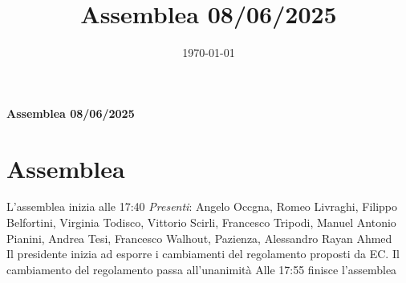 \documentclass[12pt, twoside, italian]{book}
\title{Assemblea 08/06/2025}
\author{}
\date{\today}
\begin{document}
	\begin{titlepage}
	\centering
	\vspace*{3cm}
	{\huge\bfseries Assemblea 08/06/2025 \par}
	\vspace{2cm}
	{\Large\itshape \par}
	\vfill




	\vfill
	\end{titlepage}
	\pagestyle{empty}
	\cleardoublepage
	\vspace*{8cm}
	\cleardoublepage
	\pagestyle{fancy}
	\tableofcontents
	\chapter{Assemblea}
	L'assemblea inizia alle 17:40
	\emph{Presenti}: Angelo Occgna, Romeo Livraghi, Filippo Belfortini, Virginia Todisco, Vittorio Scirli, Francesco Tripodi, Manuel Antonio Pianini, Andrea Tesi, Francesco Walhout, Pazienza, Alessandro Rayan Ahmed \\
    Il presidente inizia ad esporre i cambiamenti del regolamento proposti da EC. Il cambiamento del regolamento passa all'unanimità
    Alle 17:55 finisce l'assemblea
\end{document}
